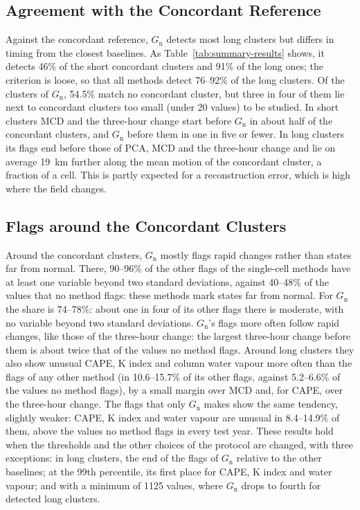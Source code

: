 \documentclass[11pt,a4paper]{article}
\newcommand{\Gn}{$G_{\mathrm{n}}$}
\begin{document}
\subsection{Agreement with the Concordant Reference}
Against the concordant reference, \Gn{} detects most long clusters but differs in timing from the closest baselines. As Table~\ref{tab:summary-results} shows, it detects 46\% of the short concordant clusters and 91\% of the long ones; the criterion is loose, so that all methods detect 76--92\% of the long clusters. Of the clusters of \Gn, 54.5\% match no concordant cluster, but three in four of them lie next to concordant clusters too small (under 20 values) to be studied. In short clusters MCD and the three-hour change start before \Gn{} in about half of the concordant clusters, and \Gn{} before them in one in five or fewer. In long clusters its flags end before those of PCA, MCD and the three-hour change and lie on average 19~km further along the mean motion of the concordant cluster, a fraction of a cell. This is partly expected for a reconstruction error, which is high where the field changes.

\subsection{Flags around the Concordant Clusters}
Around the concordant clusters, \Gn{} mostly flags rapid changes rather than states far from normal. There, 90--96\% of the other flags of the single-cell methods have at least one variable beyond two standard deviations, against 40--48\% of the values that no method flags: these methods mark states far from normal. For \Gn{} the share is 74--78\%: about one in four of its other flags there is moderate, with no variable beyond two standard deviations. \Gn's flags more often follow rapid changes, like those of the three-hour change: the largest three-hour change before them is about twice that of the values no method flags. Around long clusters they also show unusual CAPE, K index and column water vapour more often than the flags of any other method (in 10.6--15.7\% of its other flags, against 5.2--6.6\% of the values no method flags), by a small margin over MCD and, for CAPE, over the three-hour change. The flags that only \Gn{} makes show the same tendency, slightly weaker: CAPE, K index and water vapour are unusual in 8.4--14.9\% of them, above the values no method flags in every test year. These results hold when the thresholds and the other choices of the protocol are changed, with three exceptions: in long clusters, the end of the flags of \Gn{} relative to the other baselines; at the 99th percentile, its first place for CAPE, K index and water vapour; and with a minimum of 1125 values, where \Gn{} drops to fourth for detected long clusters.
\end{document}
